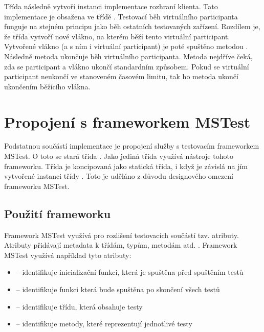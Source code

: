 Třída následně vytvoří instanci implementace rozhraní klienta. Tato implementace je obsažena ve třídě . Testovací běh virtuálního participanta funguje na stejném principu jako běh ostatních testovaných zařízení. Rozdílem je, že třída  vytvoří nové vlákno, na kterém běží tento virtuální participant. Vytvořené vlákno (a s ním i virtuální participant) je poté spuštěno metodou . Následně metoda  ukončuje běh virtuálního participanta. Metoda nejdříve čeká, zda se participant a vlákno ukončí standardním způsobem. Pokud se virtuální participant neukončí ve stanoveném časovém limitu, tak ho metoda ukončí ukončením běžícího vlákna.

\section{Propojení s frameworkem MSTest}

Podstatnou součástí implementace je propojení služby s testovacím frameworkem MSTest. O toto se stará třída . Jako jediná třída využívá nástroje tohoto frameworku. Třída je koncipovaná jako statická třída, i když je závislá na jím vytvořené instanci třídy . Toto je uděláno z důvodu designového omezení frameworku MSTest. 


\subsection{Použití frameworku}
Framework MSTest využívá pro rozlišení testovacích součástí tzv. atributy. Atributy přidávají metadata k třídám, typům, metodám atd. \cite{attribute_docs}. Framework MSTest využívá například tyto atributy:

\begin{itemize}
    \item {} -- identifikuje inicializační funkci, která je spuštěna před spuštěním testů \cite{attr_init_clean}
    \item {} -- identifikuje funkci která bude spuštěna po skončení všech testů \cite{attr_init_clean}
    \item {} -- identifikuje třídu, která obsahuje testy \cite{mstest_docs}
    \item {} -- identifikuje metody, které reprezentují jednotlivé  testy \cite{mstest_docs}
\end{itemize}

